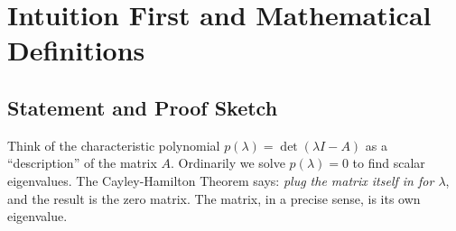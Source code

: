\documentclass[12pt,a4paper]{article}
\begin{document}
\section{Intuition First and Mathematical Definitions}

\subsection{Statement and Proof Sketch}

Think of the characteristic polynomial $p(\lambda) = \det(\lambda I - A)$ as a
``description'' of the matrix $A$.
Ordinarily we solve $p(\lambda) = 0$ to find scalar eigenvalues.
The Cayley-Hamilton Theorem says: \emph{plug the matrix itself in for $\lambda$},
and the result is the zero matrix.
The matrix, in a precise sense, is its own eigenvalue.
\end{document}
